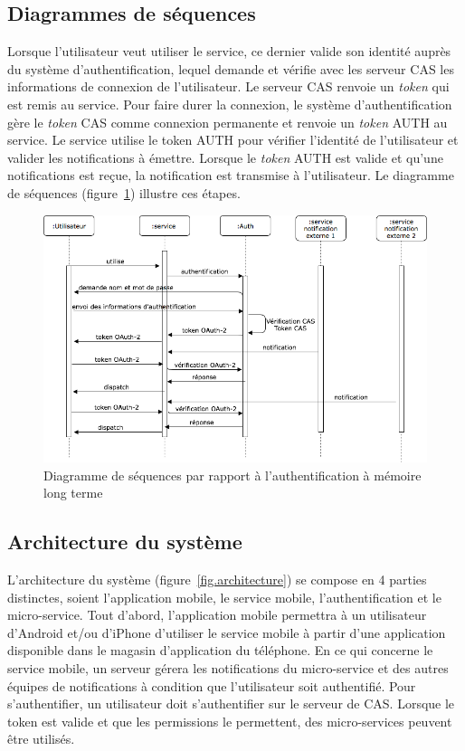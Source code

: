 	\subsection{Diagrammes de séquences}
	Lorsque l’utilisateur veut utiliser le service, ce dernier valide son identité auprès du système d'authentification, lequel demande et vérifie avec les serveur CAS les informations de connexion de l'utilisateur.  Le serveur CAS renvoie un \emph{token} qui est remis au service. Pour faire durer la connexion, le système d’authentification gère le \emph{token} CAS comme connexion permanente et renvoie un \emph{token} AUTH  au service. Le service utilise le token AUTH pour vérifier l’identité de l’utilisateur et valider les notifications à émettre. Lorsque le \emph{token} AUTH est valide et qu’une notifications est reçue, la notification est transmise à l’utilisateur. Le diagramme de séquences (figure~\ref{fig.sequences}) illustre ces étapes.
	
	\begin{figure}[hp]
		\centering
		\includegraphics[width=\textwidth]{Figures/Sequences}
		\caption{Diagramme de séquences par rapport à l'authentification à mémoire long terme}
		\label{fig.sequences}
	\end{figure}
	
	\subsection{Architecture du système}
	L’architecture du système (figure~\ref{fig.architecture}) se compose en 4 parties distinctes, soient l’application mobile, le service mobile, l’authentification et le micro-service. Tout d’abord, l’application mobile permettra à un utilisateur d’Android et/ou d’iPhone d’utiliser le service mobile à partir d’une application disponible dans le magasin d’application du téléphone. En ce qui concerne le service mobile, un serveur gérera les notifications du micro-service et des autres équipes de notifications à condition que l’utilisateur soit authentifié. Pour s'authentifier, un utilisateur doit s’authentifier sur le serveur de CAS. Lorsque le token est valide et que les permissions le permettent, des micro-services peuvent être utilisés.
	

